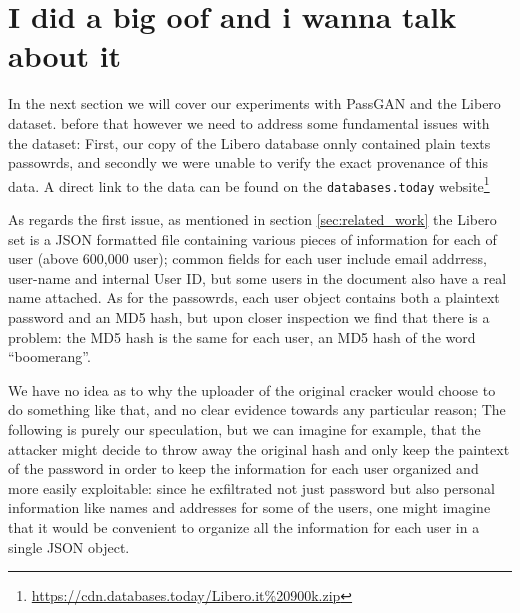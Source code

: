 \section{I did a big oof and i wanna talk about it}
In the next section we will cover our experiments with PassGAN and the Libero dataset.
before that however we need to address some fundamental issues with the dataset: First, our copy of the Libero database onnly contained plain texts passowrds, and secondly we were unable to verify the exact provenance of this data.
A direct link to the data can be found on the \texttt{databases.today} website\footnote{\url{https://cdn.databases.today/Libero.it\%20900k.zip}}

As regards the first issue, as mentioned in section \ref{sec:related_work} the Libero set is a JSON formatted file containing various pieces of information for each of user (above 600,000 user); common fields for each user include email addrress, user-name and internal User ID, but some users in the document also have a real name attached. As for the passowrds, each user object contains both a plaintext password and an MD5 hash, but upon closer inspection we find that there is a problem: the MD5 hash is the same for each user, an MD5 hash of the word \enquote{boomerang}.

We have no idea as to why the uploader of the original cracker would choose to do something like that, and no clear evidence towards any particular reason; The following is purely our speculation, but we can imagine for example, that the attacker might decide to throw away the original hash and only keep the paintext of the password in order to keep the information for each user organized and more easily exploitable: since he exfiltrated not just password but also personal information like names and addresses for some of the users, one might imagine that it would be convenient to organize all the information for each user in a single JSON object.

